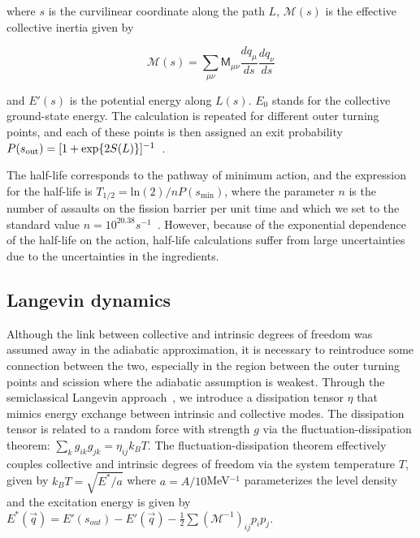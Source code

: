 \noindent where $s$ is the curvilinear coordinate along the path $L$, $\mathcal{M}(s)$ is the effective collective inertia given by~\cite{Sadhukhan2013}

\begin{equation}
\mathcal{M}(s) = \sum_{\mu\nu} \mathsf{M}_{\mu\nu} \frac{dq_\mu}{ds} \frac{dq_\nu}{ds}
\end{equation}

\noindent and $E'(s)$ is the potential energy along $L(s)$. $E_0$ stands for the collective ground-state energy. The calculation is repeated for different outer turning points, and each of these points is then assigned an exit probability $P(s_{\rm out})=[1+\exp{2S(L)}]^{-1}$~\cite{Baran1978}. 

The half-life corresponds to the pathway of minimum action, and the expression for the half-life is $T_{1/2} = \mathrm{ln}(2)/nP(s_\mathrm{min})$, where the parameter $n$ is the number of assaults on the fission barrier per unit time and which we set to the standard value $n=10^{20.38} s^{-1}$~\cite{Baran1978}. However, because of the exponential dependence of the half-life on the action, half-life calculations suffer from large uncertainties due to the uncertainties in the ingredients.

\subsection{Langevin dynamics}

Although the link between collective and intrinsic degrees of freedom was assumed away in the adiabatic approximation, it is necessary to reintroduce some connection between the two, especially in the region between the outer turning points and scission where the adiabatic assumption is weakest. Through the semiclassical Langevin approach~\cite{Abe1996,Frobrich1998,Sadhukhan2016}, we introduce a dissipation tensor $\eta$ that mimics energy exchange between intrinsic and collective modes. The dissipation tensor is related to a random force with strength $g$ via the fluctuation-dissipation theorem: $\sum_k g_{ik}g_{jk} = \eta_{ij}k_BT$. The fluctuation-dissipation theorem effectively couples collective and intrinsic degrees of freedom via the system temperature $T$, given by $k_BT = \sqrt{E^*/a}$ where $a=A/10$MeV$^{-1}$ parameterizes the level density and the excitation energy is given by $E^*(\vec{q}) = E'(s_{out}) - E'(\vec{q}) - \frac{1}{2}\sum\left(\mathcal{M}^{-1}\right)_{ij}p_i p_j$.

